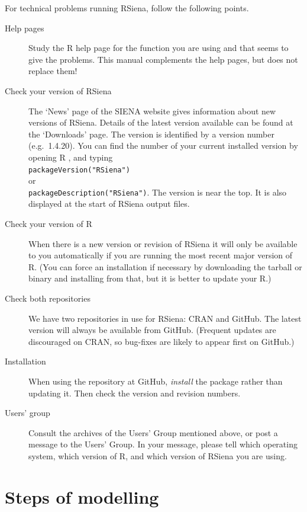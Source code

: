 \documentclass[a4paper,fleqn,11pt]{article}
\newcommand{\+}{\, + \,}
\newcommand{\R}{{\sf R }}
\newcommand{\Rn}{{\sf R}}
\newcommand{\rs}{{\sf RSiena}}
\newcommand{\RS}{{\sf \textsf{RSiena} }}
\newcommand{\SI}{{\sf SIENA }}
\begin{document}
For technical problems running \rs, follow the following points.
\begin{description}
\item[Help pages] Study the \R help page for the function you are using and that seems to give
      the problems. This manual complements the help pages,
      but does not replace them!
\item[Check your version of \RS]
  The `News' page of the \SI website gives information about new versions
  of \rs. Details of the latest version available can
  be found at the `Downloads' page.
  The version is
  identified by a version number (e.g.\ 1.4.20).
  You can find the number of your current installed version by
  opening \R, and typing\\
  \verb|packageVersion("RSiena")|   \\
  or \\
  \verb|packageDescription("RSiena")|. The version is
  near the top. It is also displayed at the
  start of \RS output files.
\item[Check your version of \Rn] When there is a new version or revision of \RS
  it will only be available to you automatically if you are running the most
  recent major version of \Rn. (You can force an installation if
  necessary by downloading the tarball or binary and installing from that, but
  it is better to update your \Rn.)
\item [Check both repositories] We have two repositories in use for \rs: CRAN
  and GitHub. The latest version will always be available from
  GitHub. (Frequent updates are discouraged on CRAN, so bug-fixes are likely to
  appear first on GitHub.)
\item[Installation] When using the repository at GitHub, \emph{install} the
  package rather than updating it. Then check the version and revision numbers.
\item[Users' group] Consult the archives of the Users' Group mentioned above, or post
     a message to the Users' Group. In your message,
     please tell which operating system, which version of \Rn, and which version
     of \RS you are using.
\end{description}

\newpage

\section{Steps of modelling}
\label{S_parts}
\end{document}
